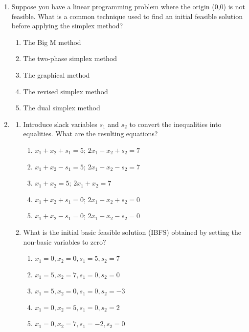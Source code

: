 \documentclass{article}%
\begin{document}
\begin{enumerate}
\begin{enumerate}
\item Artificial variable%
\item Decision variable%
\item Objective variable%
\end{enumerate}%
\vspace{1em}%
\item Suppose you have a linear programming problem where the origin (0,0) is not feasible.  What is a common technique used to find an initial feasible solution before applying the simplex method?%
\begin{enumerate}%
\item The Big M method%
\item The two-phase simplex method%
\item The graphical method%
\item The revised simplex method%
\item The dual simplex method%
\end{enumerate}%
\vspace{1em}%
\item%
\begin{enumerate}%
\item Introduce slack variables $s_1$ and $s_2$ to convert the inequalities into equalities. What are the resulting equations?%
\begin{enumerate}%
\item $x_1 + x_2 + s_1 = 5$; $2x_1 + x_2 + s_2 = 7$%
\item $x_1 + x_2 - s_1 = 5$; $2x_1 + x_2 - s_2 = 7$%
\item $x_1 + x_2 = 5$; $2x_1 + x_2 = 7$%
\item $x_1 + x_2 + s_1 = 0$; $2x_1 + x_2 + s_2 = 0$%
\item $x_1 + x_2 - s_1 = 0$; $2x_1 + x_2 - s_2 = 0$%
\end{enumerate}%
\vspace{0.5em}%
\item What is the initial basic feasible solution (IBFS) obtained by setting the non-basic variables to zero?%
\begin{enumerate}%
\item $x_1 = 0, x_2 = 0, s_1 = 5, s_2 = 7$%
\item $x_1 = 5, x_2 = 7, s_1 = 0, s_2 = 0$%
\item $x_1 = 5, x_2 = 0, s_1 = 0, s_2 = -3$%
\item $x_1 = 0, x_2 = 5, s_1 = 0, s_2 = 2$%
\item $x_1 = 0, x_2 = 7, s_1 = -2, s_2 = 0$%

\end{enumerate}
\end{enumerate}
\end{enumerate}
\end{document}
